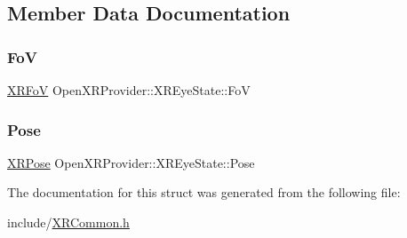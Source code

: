 \subsection{Member Data Documentation}
\mbox{\label{struct_open_x_r_provider_1_1_x_r_eye_state_a2f8fa57fe220846f33ceed97f6c7cc0f}} 
\subsubsection{\texorpdfstring{FoV}{FoV}}
{\footnotesize\ttfamily \mbox{\hyperlink{struct_open_x_r_provider_1_1_x_r_fo_v}{X\+R\+FoV}} Open\+X\+R\+Provider\+::\+X\+R\+Eye\+State\+::\+FoV}

\mbox{\label{struct_open_x_r_provider_1_1_x_r_eye_state_abd91b3f6fae38565d7caf0ec4b40a0c3}} 
\subsubsection{\texorpdfstring{Pose}{Pose}}
{\footnotesize\ttfamily \mbox{\hyperlink{struct_open_x_r_provider_1_1_x_r_pose}{X\+R\+Pose}} Open\+X\+R\+Provider\+::\+X\+R\+Eye\+State\+::\+Pose}



The documentation for this struct was generated from the following file\+:\begin{DoxyCompactItemize}
\item 
include/\mbox{\hyperlink{_x_r_common_8h}{X\+R\+Common.\+h}}\end{DoxyCompactItemize}
